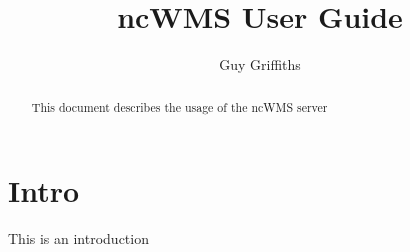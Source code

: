 \documentclass[a4paper]{refart}
\title{ncWMS User Guide}
\author{Guy Griffiths}
\begin{document}
\maketitle

\begin{abstract}
This document describes the usage of the ncWMS server
\end{abstract}

\tableofcontents

\newpage

\section{Intro}
This is an introduction
\end{document}
